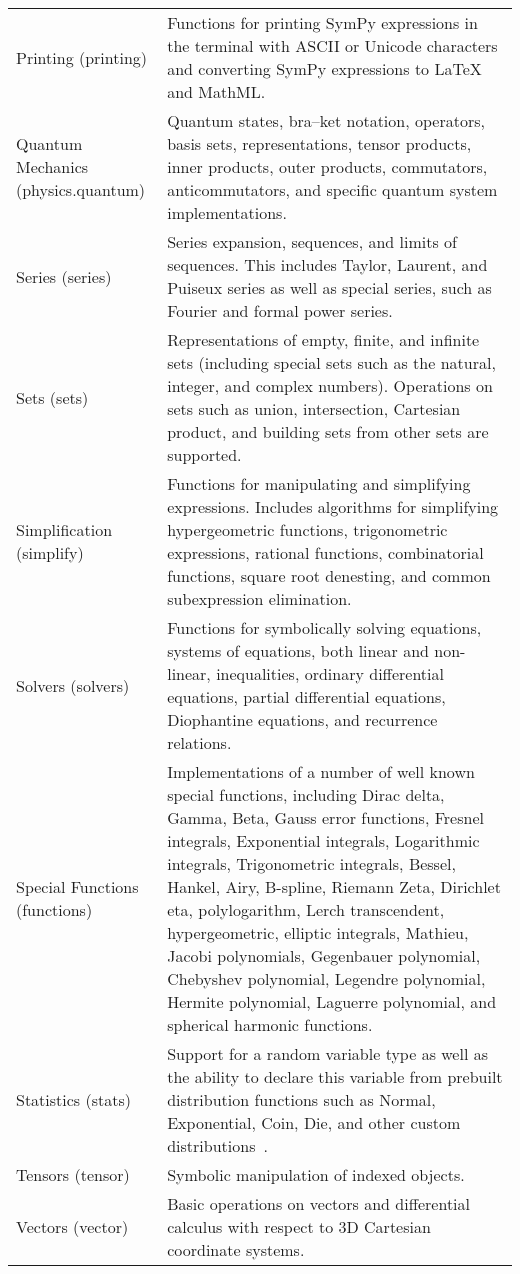 \begin{longtable}[htbc]{p{0.3\linewidth}p{0.7\linewidth}}
Printing (printing) & Functions for printing SymPy expressions in the terminal with ASCII
or Unicode characters and converting SymPy expressions to \LaTeX{} and
MathML.\\

Quantum Mechanics (physics.quantum) & Quantum states, bra--ket notation, operators, basis sets,
representations, tensor products, inner products, outer products, commutators,
anticommutators, and specific quantum system implementations.\\

Series (series) & Series expansion, sequences, and limits of sequences.
This includes Taylor, Laurent, and Puiseux series as well as special series, such
as Fourier and formal power series.\\

Sets (sets) & Representations of empty, finite, and infinite sets (including
special sets such as the natural, integer, and complex numbers). Operations
on sets such as union, intersection, Cartesian product, and building sets from
other sets are supported.\\

Simplification (simplify) & Functions for manipulating and simplifying expressions.
Includes algorithms for simplifying hypergeometric functions, trigonometric
expressions, rational functions, combinatorial functions, square root
denesting, and common subexpression elimination.\\

Solvers (solvers) & Functions for symbolically solving equations, systems
of equations, both linear and non-linear, inequalities, ordinary differential
equations, partial differential equations, Diophantine equations, and
recurrence relations.\\

Special Functions (functions) & Implementations of a number of well known special functions,
including Dirac delta, Gamma, Beta, Gauss error functions, Fresnel integrals,
Exponential integrals, Logarithmic integrals, Trigonometric integrals, Bessel,
Hankel, Airy, B-spline, Riemann Zeta, Dirichlet eta, polylogarithm, Lerch
transcendent, hypergeometric, elliptic integrals, Mathieu, Jacobi polynomials,
Gegenbauer polynomial, Chebyshev polynomial, Legendre polynomial, Hermite
polynomial, Laguerre polynomial, and
spherical harmonic functions.\\

Statistics (stats) & Support for a random variable type as well as the ability to
declare this variable from prebuilt distribution functions such as
Normal, Exponential, Coin, Die, and other custom distributions~\cite{StatsMRocklin}.\\

Tensors (tensor) & Symbolic manipulation of indexed objects.\\

Vectors (vector) & Basic operations on vectors and differential calculus with respect
to 3D Cartesian coordinate systems.\\
\bottomrule

\end{longtable}

